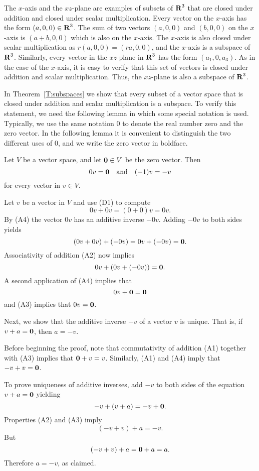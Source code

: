 \documentclass{ximera}
\begin{document}
The $x$-axis and the $xz$-plane are examples of subsets of $\mbox{$\bf{R}$}^3$
that are closed under addition and closed under scalar multiplication.
Every vector on the $x$-axis has the form $(a,0,0)\in\mbox{$\bf{R}$}^3$.
The sum of two vectors $(a,0,0)$ and $(b,0,0)$ on the $x$-axis is
$(a+b,0,0)$ which is also on the $x$-axis.  The $x$-axis
is also closed under scalar multiplication as $r(a,0,0)=(ra,0,0)$,
and the $x$-axis is a subspace of $\mbox{$\bf{R}$}^3$.  Similarly, every vector
in the $xz$-plane in $\mbox{$\bf{R}$}^3$ has the form $(a_1,0,a_3)$. As in the
case of the $x$-axis, it is easy to verify that this set of vectors
is closed under addition and scalar multiplication.  Thus, the
$xz$-plane is also a subspace of $\mbox{$\bf{R}$}^3$.

In Theorem~\ref{T:subspaces} we show that every subset of a vector space 
that is closed under addition and scalar multiplication is a subspace.  
To verify this statement, we need the following lemma in which some special 
notation is used.  Typically, we use the same notation $0$ to denote the
real number zero and the zero vector.  In the following
lemma it is convenient to distinguish the two different uses of $0$, and we 
write the zero vector in boldface.

\begin{lemma}  \label{lem:AddId}
Let $V$ be a vector space, and let ${\bf 0}\in V$ be the zero vector.  Then
\[
0v={\bf 0} \quad \mbox{and}\quad (-1)v=-v
\]
for every vector in $v\in V$.
\end{lemma}

\proof Let $v$ be a vector in $V$ and use (D1) to compute
\[
     0v + 0v  = (0+0)v = 0v.
\]
By (A4) the vector $0v$ has an additive inverse $-0v$.  Adding $-0v$ 
to both sides yields 
\[
(0v + 0v) + (-0v) = 0v + (-0v) = {\bf 0}.
\] 
Associativity of addition (A2) now implies 
\[
0v + (0v + (-0v)) = {\bf 0}.
\]
A second application of (A4) implies that 
\[
0v + {\bf 0} = {\bf 0}
\]
and (A3) implies that $0v={\bf 0}$.

Next, we show that the additive inverse $-v$ of a vector $v$ is unique. 
That is, if $v + a = {\bf 0}$, then $a=-v$.  

Before beginning the proof, note that commutativity of addition (A1) together 
with (A3) implies that ${\bf 0}+v=v$.  Similarly, (A1) and (A4) imply that 
$-v+v={\bf 0}$.  

To prove uniqueness of additive inverses, add $-v$ to both sides of the 
equation $v + a = {\bf 0}$ yielding 
\[
-v + (v + a) = -v + {\bf 0}. 
\]
Properties (A2) and (A3) imply
\[
(-v + v) + a = -v.
\]
But 
\[
(-v + v) + a = {\bf 0} + a = a.
\]
Therefore $a = -v$, as claimed.
\end{document}
